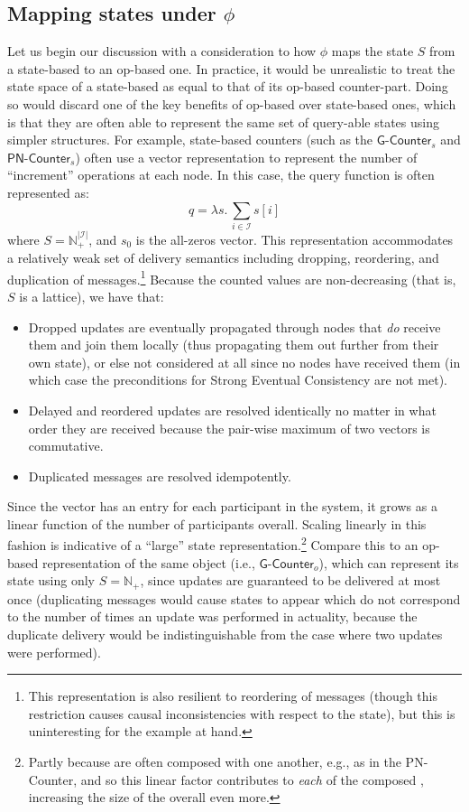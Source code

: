 \subsection{Mapping states under $\phi$}
Let us begin our discussion with a consideration to how $\phi$ maps the state
$S$ from a state-based \CRDT to an op-based one. In practice, it would be
unrealistic to treat the state space of a state-based \CRDT as equal to that of
its op-based counter-part. Doing so would discard one of the key benefits of
op-based \CRDTs over state-based ones, which is that they are often able to
represent the same set of query-able states using simpler structures. For
example, state-based counters (such as the $\textsf{G-Counter}_s$ and
$\textsf{PN-Counter}_s$) often use a vector representation to represent the
number of ``increment'' operations at each node. In this case, the query
function is often represented as:
\[
  q = \lambda s.\, \sum_{i \in \mathcal{I}} s[i]
\]
where $S = \mathbb{N}^{|\mathcal{I}|}_+$, and $s_0$ is the all-zeros vector.
This representation accommodates a relatively weak set of delivery semantics
including dropping, reordering, and duplication of messages.\footnote{This
representation is also resilient to reordering of messages (though this
restriction causes causal inconsistencies with respect to the state), but this
is uninteresting for the example at hand.} Because the counted values are
non-decreasing (that is, $S$ is a lattice), we have that:
\begin{itemize}
  \item Dropped updates are eventually propagated through nodes that \emph{do}
    receive them and join them locally (thus propagating them out further from
    their own state), or else not considered at all since no nodes have received
    them (in which case the preconditions for Strong Eventual Consistency are
    not met).
  \item Delayed and reordered updates are resolved identically no matter in what
    order they are received because the pair-wise maximum of two vectors is
    commutative.
  \item Duplicated messages are resolved idempotently.
\end{itemize}
Since the vector has an entry for each participant in the system, it grows
as a linear function of the number of participants overall. Scaling linearly in
this fashion is indicative of a ``large'' state representation.\footnote{Partly
because \CRDTs are often composed with one another, e.g., as in the PN-Counter,
and so this linear factor contributes to \emph{each} of the composed \CRDTs,
increasing the size of the overall \CRDT even more.} Compare this to an op-based
representation of the same object (i.e., $\textsf{G-Counter}_o$), which can
represent its state using only $S = \mathbb{N}_+$, since updates are guaranteed
to be delivered at most once (duplicating messages would cause states to appear
which do not correspond to the number of times an update was performed in
actuality, because the duplicate delivery would be indistinguishable from the
case where two updates were performed).


